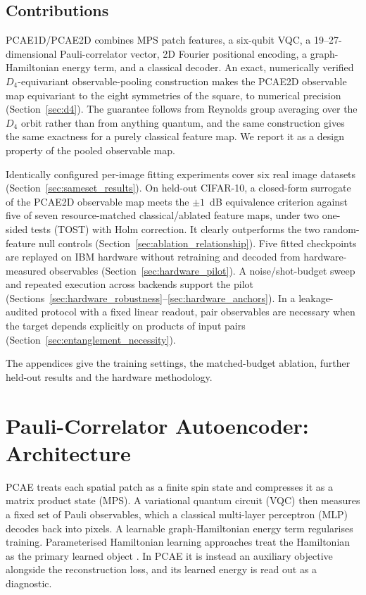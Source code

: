 \documentclass[pdflatex,sn-basic]{sn-jnl}
\begin{document}
\subsection*{Contributions}

PCAE1D/PCAE2D combines MPS patch features, a six-qubit VQC, a 19--27-dimensional Pauli-correlator vector, 2D Fourier positional encoding, a graph-Hamiltonian energy term, and a classical decoder.
An exact, numerically verified $D_4$-equivariant observable-pooling construction makes the PCAE2D observable map equivariant to the eight symmetries of the square, to numerical precision (Section~\ref{sec:d4}).
The guarantee follows from Reynolds group averaging over the $D_4$ orbit \citep{Puny2022} rather than from anything quantum, and the same construction gives the same exactness for a purely classical feature map.
We report it as a design property of the pooled observable map.

Identically configured per-image fitting experiments cover six real image datasets (Section~\ref{sec:sameset_results}).
On held-out CIFAR-10, a closed-form surrogate of the PCAE2D observable map meets the $\pm1$~dB equivalence criterion against five of seven resource-matched classical/ablated feature maps, under two one-sided tests (TOST) with Holm correction.
It clearly outperforms the two random-feature null controls (Section~\ref{sec:ablation_relationship}).
Five fitted checkpoints are replayed on IBM hardware without retraining and decoded from hardware-measured observables (Section~\ref{sec:hardware_pilot}).
A noise/shot-budget sweep and repeated execution across backends support the pilot (Sections~\ref{sec:hardware_robustness}--\ref{sec:hardware_anchors}).
In a leakage-audited protocol with a fixed linear readout, pair observables are necessary when the target depends explicitly on products of input pairs (Section~\ref{sec:entanglement_necessity}).

The appendices give the training settings, the matched-budget ablation, further held-out results and the hardware methodology.

\section{Pauli-Correlator Autoencoder: Architecture}
\label{sec:architecture}

PCAE treats each spatial patch as a finite spin state and compresses it as a matrix product state (MPS).
A variational quantum circuit (VQC) then measures a fixed set of Pauli observables, which a classical multi-layer perceptron (MLP) decodes back into pixels.
A learnable graph-Hamiltonian energy term regularises training.
Parameterised Hamiltonian learning approaches treat the Hamiltonian as the primary learned object \citep{Shi2022}.
In PCAE it is instead an auxiliary objective alongside the reconstruction loss, and its learned energy is read out as a diagnostic.
\end{document}
